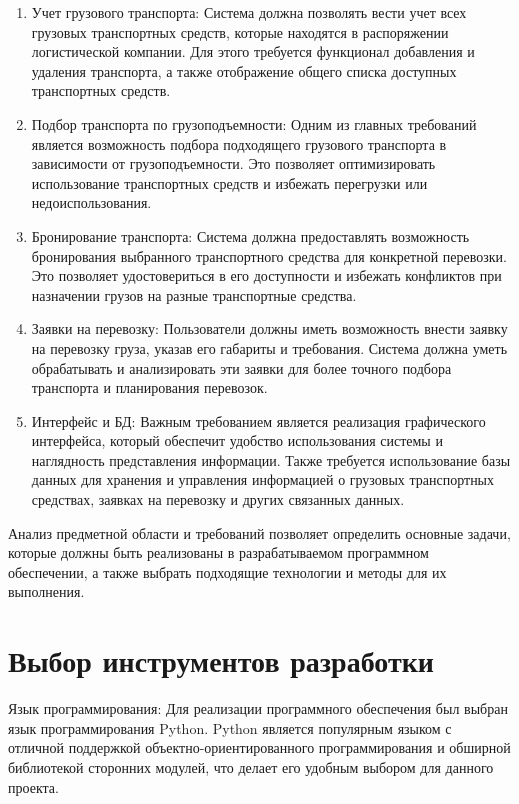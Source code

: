 \documentclass[14pt]{extreport}
\begin{document}
        \begin{enumerate}
            \item Учет грузового транспорта: Система должна позволять вести учет всех грузовых транспортных средств, которые находятся в распоряжении логистической компании. Для этого требуется функционал добавления и удаления транспорта, а также отображение общего списка доступных транспортных средств.
            \item Подбор транспорта по грузоподъемности: Одним из главных требований является возможность подбора подходящего грузового транспорта в зависимости от грузоподъемности. Это позволяет оптимизировать использование транспортных средств и избежать перегрузки или недоиспользования.
            \item Бронирование транспорта: Система должна предоставлять возможность бронирования выбранного транспортного средства для конкретной перевозки. Это позволяет удостовериться в его доступности и избежать конфликтов при назначении грузов на разные транспортные средства.
            \item Заявки на перевозку: Пользователи должны иметь возможность внести заявку на перевозку груза, указав его габариты и требования. Система должна уметь обрабатывать и анализировать эти заявки для более точного подбора транспорта и планирования перевозок.
            \item Интерфейс и БД: Важным требованием является реализация графического интерфейса, который обеспечит удобство использования системы и наглядность представления информации. Также требуется использование базы данных для хранения и управления информацией о грузовых транспортных средствах, заявках на перевозку и других связанных данных.
        \end{enumerate}

        Анализ предметной области и требований позволяет определить основные задачи, которые должны быть реализованы в разрабатываемом программном обеспечении, а также выбрать подходящие технологии и методы для их выполнения.

    \section{Выбор инструментов разработки}

        Язык программирования: Для реализации программного обеспечения был выбран язык программирования Python. Python является популярным языком с отличной поддержкой объектно-ориентированного программирования и обширной библиотекой сторонних модулей, что делает его удобным выбором для данного проекта.
\end{document}
